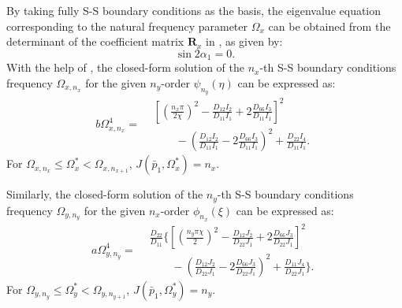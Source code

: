 \documentclass[preprint,12pt,number]{elsarticle}
\providecommand{\DIFaddbegin}{} %
\providecommand{\DIFaddend}{} %
\providecommand{\DIFdelbegin}{} %
\providecommand{\DIFdelend}{} %
\newcommand{\DIFscaledelfig}{0.5}
\newlength{\DIFdelgraphicswidth} %
\newlength{\DIFdelgraphicsheight} %
\newcommand{\DIFaddincludegraphics}[2][]{{\color{blue}\fbox{\DIFOincludegraphics[#1]{#2}}}} %
\newcommand{\DIFdelincludegraphics}[2][]{%
\sbox{\DIFdelgraphicsbox}{\DIFOincludegraphics[#1]{#2}}%
\settoboxwidth{\DIFdelgraphicswidth}{\DIFdelgraphicsbox} %
\settoboxtotalheight{\DIFdelgraphicsheight}{\DIFdelgraphicsbox} %
\scalebox{\DIFscaledelfig}{%
\parbox[b]{\DIFdelgraphicswidth}{\usebox{\DIFdelgraphicsbox}\\[-\baselineskip] \rule{\DIFdelgraphicswidth}{0em}}\llap{\resizebox{\DIFdelgraphicswidth}{\DIFdelgraphicsheight}{%
\setlength{\unitlength}{\DIFdelgraphicswidth}%
\begin{picture}(1,1)%
\thicklines\linethickness{2pt} %
{\color[rgb]{1,0,0}\put(0,0){\framebox(1,1){}}}%
{\color[rgb]{1,0,0}\put(0,0){\line( 1,1){1}}}%
{\color[rgb]{1,0,0}\put(0,1){\line(1,-1){1}}}%
\end{picture}%
}\hspace*{3pt}}} %
} %
\DeclareRobustCommand{\DIFaddbegin}{\DIFOaddbegin \let\includegraphics\DIFaddincludegraphics} %
\DeclareRobustCommand{\DIFaddend}{\DIFOaddend \let\includegraphics\DIFOincludegraphics} %
\DeclareRobustCommand{\DIFdelbegin}{\DIFOdelbegin \let\includegraphics\DIFdelincludegraphics} %
\DeclareRobustCommand{\DIFdelend}{\DIFOaddend \let\includegraphics\DIFOincludegraphics} %
\begin{document}
By taking fully S-S boundary conditions as the basis, the eigenvalue equation corresponding to the natural frequency parameter $ \Omega_x $ can be obtained from the determinant of the coefficient matrix $ \mathbf{R}_x $ in , as given by:
%
\begin{equation}\label{eq:SSx} 
\sin 2\alpha_1 = 0.
\end{equation}
%
With the help of , the closed-form solution of the $n_x$-th S-S boundary conditions frequency $\Omega_{x,n_x}$ for the given $n_y$-order $\psi_{n_y}(\eta)$ can be expressed as:
%
\begin{equation}\label{eq:J_simpx}
b \Omega^4_{x,n_x} =
\DIFdelbegin %
\DIFdelend \DIFaddbegin \begin{aligned}
	&\left[\left(\frac{n_x\pi}{2\chi}\right)^2 - \frac{D_{12}I_2}{D_{11}I_1} + 2 \frac{D_{66}I_3}{D_{11}I_1}\right]^2 \\
	&\qquad- \left(\frac{D_{12}I_2}{D_{11}I_1} - 2 \frac{D_{66}I_3}{D_{11}I_1}\right)^2
	+ \frac{D_{22}I_4}{D_{11}I_1}.
\end{aligned}\DIFaddend 
\end{equation}
%
For $\Omega_{x,n_x} \leq \Omega_x^* < \Omega_{x,n_{x+1}}$, $J(\bar{p}_1, \Omega_x^*) = n_x$.

Similarly, the closed-form solution of the $n_y$-th S-S boundary conditions frequency $\Omega_{y,n_y}$ for the given $n_x$-order $\phi_{n_x}(\xi)$ can be expressed as:
%
\begin{equation}\label{eq:J_simpy}
a\Omega^4_{y,n_y}= 
\DIFdelbegin %
\DIFdelend \DIFaddbegin \begin{aligned}
	&\frac{D_{22}}{D_{11}}\Biggl\{\left[\left(\frac{n_y\pi\chi}{2}\right)^2 - \frac{D_{12}J_2}{D_{22}J_1} + 2 \frac{D_{66}J_3}{D_{22}J_1}\right]^2 \\ 
	&\qquad - \left(\frac{D_{12}J_2}{D_{22}J_1} - 2 \frac{D_{66}J_3}{D_{22}J_1}\right)^2
	+ \frac{D_{11}J_4}{D_{22}J_1}\Biggr\}.
\end{aligned}\DIFaddend 
\end{equation}
%
For $\Omega_{y,n_y} \leq \Omega_y^* < \Omega_{y,n_{y+1}}$, $J(\bar{p}_1, \Omega_y^*) = n_y$.
\end{document}
